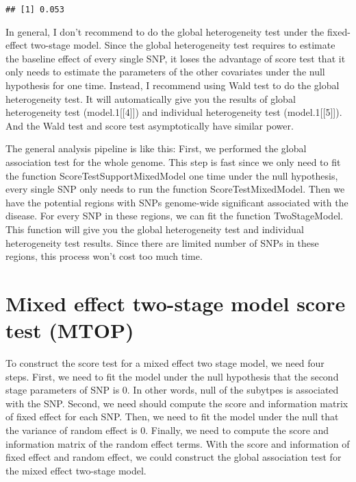 \documentclass[11pt,]{article}
\begin{document}
\begin{verbatim}
## [1] 0.053
\end{verbatim}

In general, I don't recommend to do the global heterogeneity test under
the fixed-effect two-stage model. Since the global heterogeneity test
requires to estimate the baseline effect of every single SNP, it loses
the advantage of score test that it only needs to estimate the
parameters of the other covariates under the null hypothesis for one
time. Instead, I recommend using Wald test to do the global
heterogeneity test. It will automatically give you the results of global
heterogeneity test (model.1{[}{[}4{]}{]}) and individual heterogeneity
test (model.1{[}{[}5{]}{]}). And the Wald test and score test
asymptotically have similar power.

The general analysis pipeline is like this: First, we performed the
global association test for the whole genome. This step is fast since we
only need to fit the function ScoreTestSupportMixedModel one time under
the null hypothesis, every single SNP only needs to run the function
ScoreTestMixedModel. Then we have the potential regions with SNPs
genome-wide significant associated with the disease. For every SNP in
these regions, we can fit the function TwoStageModel. This function will
give you the global heterogeneity test and individual heterogeneity test
results. Since there are limited number of SNPs in these regions, this
process won't cost too much time.

\hypertarget{mixed-effect-two-stage-model-score-test-mtop}{%
\section{Mixed effect two-stage model score test
(MTOP)}\label{mixed-effect-two-stage-model-score-test-mtop}}

To construct the score test for a mixed effect two stage model, we need
four steps. First, we need to fit the model under the null hypothesis
that the second stage parameters of SNP is 0. In other words, null of
the subytpes is associated with the SNP. Second, we need should compute
the score and information matrix of fixed effect for each SNP. Then, we
need to fit the model under the null that the variance of random effect
is 0. Finally, we need to compute the score and information matrix of
the random effect terms. With the score and information of fixed effect
and random effect, we could construct the global association test for
the mixed effect two-stage model.
\end{document}
